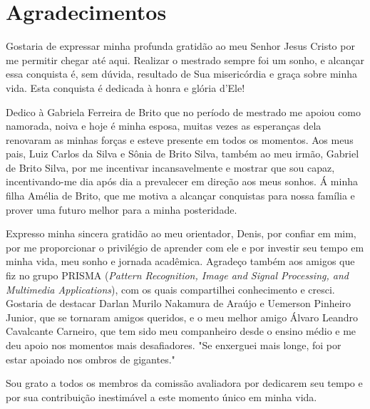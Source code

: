 \newpage
\thispagestyle{empty}
\section*{Agradecimentos}
Gostaria de expressar minha profunda gratidão ao meu Senhor Jesus Cristo por me permitir chegar até aqui. Realizar o mestrado sempre foi um sonho, e alcançar essa conquista é, sem dúvida, resultado de Sua misericórdia e graça sobre minha vida. Esta conquista é dedicada à honra e glória d'Ele!

Dedico à Gabriela Ferreira de Brito que no período de mestrado me apoiou como namorada, noiva e hoje é minha esposa, muitas vezes as esperanças dela renovaram as minhas forças e esteve presente em todos os momentos. Aos meus pais, Luiz Carlos da Silva e Sônia de Brito Silva, também ao meu irmão, Gabriel de Brito Silva, por me incentivar incansavelmente e mostrar que sou capaz, incentivando-me dia após dia a prevalecer em direção aos meus sonhos. Á minha filha Amélia de Brito, que me motiva a alcançar conquistas para nossa família e prover uma futuro melhor para a minha posteridade.

Expresso minha sincera gratidão ao meu orientador, Denis, por confiar em mim, por me proporcionar o privilégio de aprender com ele e por investir seu tempo em minha vida, meu sonho e jornada acadêmica. Agradeço também aos amigos que fiz no grupo PRISMA (\textit{Pattern Recognition, Image and Signal Processing, and Multimedia Applications}), com os quais compartilhei conhecimento e cresci. Gostaria de destacar Darlan Murilo Nakamura de Araújo e Uemerson Pinheiro Junior, que se tornaram amigos queridos, e o meu melhor amigo Álvaro Leandro Cavalcante Carneiro, que tem sido meu companheiro desde o ensino médio e me deu apoio nos momentos mais desafiadores. "Se enxerguei mais longe, foi por estar apoiado nos ombros de gigantes."

Sou grato a todos os membros da comissão avaliadora por dedicarem seu tempo e por sua contribuição inestimável a este momento único em minha vida.